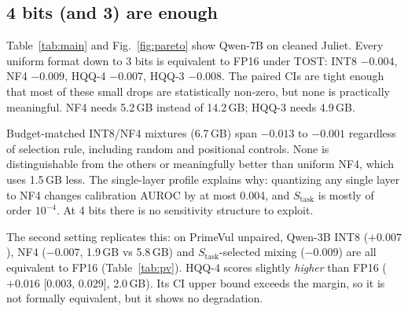 \documentclass[conference]{IEEEtran}
\newcommand{\stask}{S_{\text{task}}}
\begin{document}
\subsection{4 bits (and 3) are enough}\label{sec:fourbit}
Table~\ref{tab:main} and Fig.~\ref{fig:pareto} show Qwen-7B on cleaned Juliet. Every uniform format down to 3 bits is equivalent to FP16 under TOST: INT8 $-0.004$, NF4 $-0.009$, HQQ-4 $-0.007$, HQQ-3 $-0.008$. The paired CIs are tight enough that most of these small drops are statistically non-zero, but none is practically meaningful. NF4 needs 5.2\,GB instead of 14.2\,GB; HQQ-3 needs 4.9\,GB.

Budget-matched INT8/NF4 mixtures (6.7\,GB) span $-0.013$ to $-0.001$ regardless of selection rule, including random and positional controls. None is distinguishable from the others or meaningfully better than uniform NF4, which uses 1.5\,GB less. The single-layer profile explains why: quantizing any single layer to NF4 changes calibration AUROC by at most 0.004, and $\stask$ is mostly of order $10^{-4}$. At 4 bits there is no sensitivity structure to exploit.

The second setting replicates this: on PrimeVul unpaired, Qwen-3B INT8 ($+0.007$), NF4 ($-0.007$, 1.9\,GB vs 5.8\,GB) and $\stask$-selected mixing ($-0.009$) are all equivalent to FP16 (Table~\ref{tab:pv}). HQQ-4 scores slightly \emph{higher} than FP16 ($+0.016$ [0.003, 0.029], 2.0\,GB). Its CI upper bound exceeds the margin, so it is not formally equivalent, but it shows no degradation.
\end{document}
